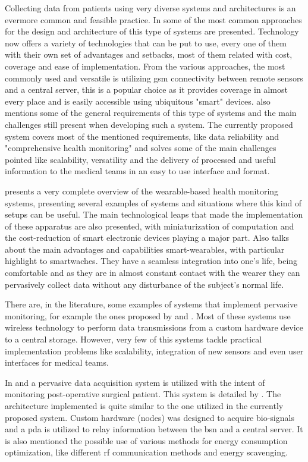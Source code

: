 Collecting data from patients using very diverse systems and architectures is an evermore common and feasible practice. In \citet{b_lista} some of the most common approaches for the design and architecture of this type of systems are presented. Technology now offers a variety of technologies that can be put to use, every one of them with their own set of advantages and setbacks, most of them related with cost, coverage and ease of implementation. From the various approaches, the most commonly used and versatile is utilizing \ac{gsm} connectivity between remote sensors and a central server, this is a popular choice as it provides coverage in almost every place and is easily accessible using ubiquitous "smart" devices. \citet{b_lista} also mentions some of the general requirements of this type of systems and the main challenges still present when developing such a system. The currently proposed system covers most of the mentioned requirements, like data reliability and "comprehensive health monitoring" and solves some of the main challenges pointed like scalability, versatility and the delivery of processed and useful information to the medical teams in an easy to use interface and format.

\citet{b_lista2} presents a very complete overview of the wearable-based health monitoring systems, presenting several examples of systems and situations where this kind of setups can be useful. The main technological leaps that made the implementation of these apparatus are also presented, with miniaturization of computation and the cost-reduction of smart electronic devices playing a major part. Also \citet{wearables} talks about the main advantages and capabilities smart-wearables, with particular highlight to smartwaches. They have a seamless integration into one's life, being comfortable and as they are in almost constant contact with the wearer they can pervasively collect data without any disturbance of the subject's normal life.

There are, in the literature, some examples of systems that implement pervasive monitoring, for example the ones proposed by \citet{b_sistema_parecido} and \citet{b_sistema_parecido2a}. Most of these systems use wireless technology to perform data transmissions from a custom hardware device to a central storage. However, very few of this systems tackle practical implementation problems like scalability, integration of new sensors and even user interfaces for medical teams.

In \citet{b_sistema_parecido2} and \citet{b_sistema_parecido3} a pervasive data acquisition system is utilized with the intent of monitoring post-operative surgical patient. This system is detailed by \citet{b_sistema_parecido2a}. The architecture implemented is quite similar to the one utilized in the currently proposed system. Custom hardware (nodes) was designed to acquire bio-signals and a \ac{pda} is utilized to relay information between the \ac{bsn} and a central server. It is also mentioned the possible use of various methods for energy consumption optimization, like different \ac{rf} communication methods and energy scavenging.

